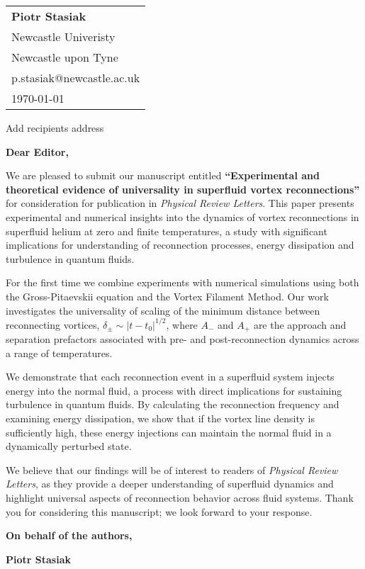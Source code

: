 \documentclass[a4paper,10pt]{letter}
\begin{document}
\begin{flushright}
    \begin{tabular}{l}
        \textbf{Piotr Stasiak} \\
        Newcastle Univeristy \\
        Newcastle  upon Tyne \\
        p.stasiak@newcastle.ac.uk \\
        \today
    \end{tabular}
\end{flushright}

\vspace{1cm}

Add recipients address\\


\vspace{1cm}

\textbf{Dear Editor,}

\vspace{0.5cm}

We are pleased to submit our manuscript entitled \textbf{``Experimental and theoretical evidence of universality in superfluid vortex reconnections''} for consideration for publication in \textit{Physical Review Letters}. This paper presents experimental and numerical insights into the dynamics of vortex reconnections in superfluid helium at zero and finite temperatures, a study with significant implications for understanding of reconnection processes, energy dissipation and turbulence in quantum fluids.

For the first time we combine experiments with numerical simulations using both the Gross-Pitaevskii equation and the Vortex Filament Method. Our work investigates the universality of scaling of the minimum distance between reconnecting vortices, $\delta_{\pm} \sim |t - t_0|^{1/2}$, where $A_{-}$ and $A_{+}$ are the approach and separation prefactors associated with pre- and post-reconnection dynamics across a range of temperatures. 

We demonstrate that each reconnection event in a superfluid system injects energy into the normal fluid, a process with direct implications for sustaining turbulence in quantum fluids. By calculating the reconnection frequency and examining energy dissipation, we show that if the vortex line density is sufficiently high, these energy injections can maintain the normal fluid in a dynamically perturbed state.

We believe that our findings will be of interest to readers of \textit{Physical Review Letters}, as they provide a deeper understanding of superfluid dynamics and highlight universal aspects of reconnection behavior across fluid systems. Thank you for considering this manuscript; we look forward to your response.
\vspace{0.5cm}

\textbf{On behalf of the authors,}

\vspace{1cm}

\textbf{Piotr Stasiak}
\end{document}
